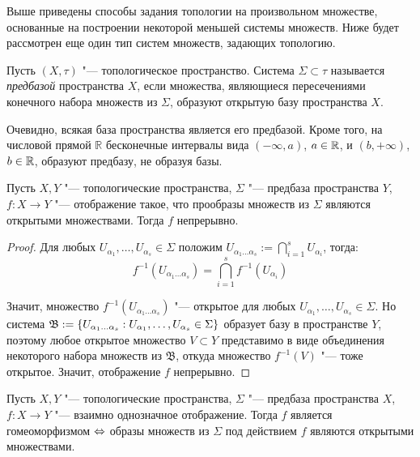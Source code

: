 \begin{note}
    Выше приведены способы задания топологии на произвольном множестве, основанные на построении некоторой меньшей системы множеств. Ниже будет рассмотрен еще один тип систем множеств, задающих топологию.
\end{note}

\begin{definition}
    Пусть $(X, \tau)$ "--- топологическое пространство. Система $\Sigma \subset \tau$ называется \textit{предбазой} пространства $X$, если множества, являющиеся пересечениями конечного набора множеств из $\Sigma$, образуют открытую базу пространства $X$.
\end{definition}

\begin{example}
    Очевидно, всякая база пространства является его предбазой. Кроме того, на числовой прямой $\mathbb R$ бесконечные интервалы вида $(-\infty, a)$, $a \in \mathbb{R}$, и $(b, +\infty)$, $b \in \mathbb{R}$, образуют предбазу, не образуя базы.
\end{example}

\begin{proposition}\label{propcontsubbase}
    Пусть $X, Y$ "--- топологические пространства, $\Sigma$ "--- предбаза прост\-ранства $Y$, $f : X \to Y$ "--- отображение такое, что прообразы множеств из $\Sigma$ являются открытыми множествами. Тогда $f$ непрерывно.
\end{proposition}

\begin{proof}
    Для любых $U_{\alpha_1}, \dotsc, U_{\alpha_s} \in \Sigma$ положим $U_{\alpha_1 \dotsc \alpha_s} := \bigcap_{i=1}^s U_{\alpha_i}$, тогда:
    \[f^{-1}(U_{\alpha_1 \dotsc \alpha_s}) = \bigcap_{i=1}^s f^{-1}(U_{\alpha_i})\]
    
    Значит, множество $f^{-1}(U_{\alpha_1 \dotsc \alpha_s})$ "--- открытое для любых $U_{\alpha_1}, \dotsc, U_{\alpha_s} \in \Sigma$. Но система $\mathfrak B := \{U_{\alpha_1 \dotsc \alpha_s} : U_{\alpha_1}, \dotsc, U_{\alpha_s} \in \Sigma\}$ образует базу в пространстве $Y$, поэтому любое открытое множество $V \subset Y$ представимо в виде объединения некоторого набора множеств из $\mathfrak{B}$, откуда множество $f^{-1}(V)$ "--- тоже открытое. Значит, отображение $f$ непрерывно.
\end{proof}
    
\begin{proposition}\label{propisomsubbase}
    Пусть $X, Y$ "--- топологические пространства, $\Sigma$ "--- предбаза прост\-ранства $X$, $f : X \to Y$ "--- взаимно однозначное отображение. Тогда $f$ является гомеоморфизмом $\Leftrightarrow$ образы множеств из $\Sigma$ под действием $f$ являются открытыми множествами.
\end{proposition}

